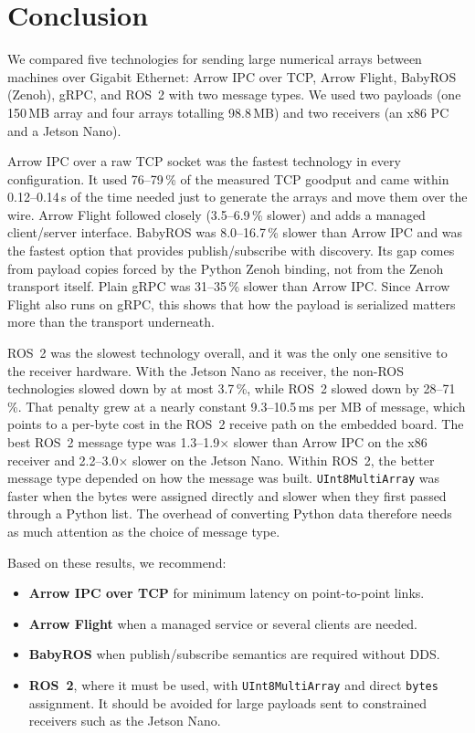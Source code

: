 
\section{Conclusion}
\label{sec:conclusion}

We compared five technologies for sending large numerical arrays between machines
over Gigabit Ethernet: Arrow IPC over TCP, Arrow Flight, BabyROS (Zenoh), gRPC, and
ROS~2 with two message types. We used two payloads (one 150\,MB array and four arrays
totalling 98.8\,MB) and two receivers (an x86 PC and a Jetson Nano).

Arrow IPC over a raw TCP socket was the fastest technology in every configuration.
It used 76--79\,\% of the measured TCP goodput and came within 0.12--0.14\,s of the
time needed just to generate the arrays and move them over the wire. Arrow Flight
followed closely (3.5--6.9\,\% slower) and adds a managed client/server interface.
BabyROS was 8.0--16.7\,\% slower than Arrow IPC and was the fastest option that
provides publish/subscribe with discovery. Its gap comes from payload copies forced by
the Python Zenoh binding, not from the Zenoh transport itself. Plain gRPC was
31--35\,\% slower than Arrow IPC. Since Arrow Flight also runs on gRPC, this shows
that how the payload is serialized matters more than the transport underneath.

ROS~2 was the slowest technology overall, and it was the only one sensitive to the
receiver hardware. With the Jetson Nano as receiver, the non-ROS technologies slowed
down by at most 3.7\,\%, while ROS~2 slowed down by 28--71\,\%. That penalty grew at
a nearly constant 9.3--10.5\,ms per MB of message, which points to a per-byte cost in the
ROS~2 receive path on the embedded board. The best ROS~2 message type was
1.3--1.9$\times$ slower than Arrow IPC on the x86 receiver and 2.2--3.0$\times$ slower
on the Jetson Nano. Within ROS~2, the better message type depended on how the message
was built. \texttt{UInt8MultiArray} was faster when the bytes were assigned directly
and slower when they first passed through a Python list. The overhead of converting
Python data therefore needs as much attention as the choice of message type.

Based on these results, we recommend:
\begin{itemize}
  \item \textbf{Arrow IPC over TCP} for minimum latency on point-to-point links.
  \item \textbf{Arrow Flight} when a managed service or several clients are needed.
  \item \textbf{BabyROS} when publish/subscribe semantics are required without DDS.
  \item \textbf{ROS~2}, where it must be used, with \texttt{UInt8MultiArray} and
  direct \texttt{bytes} assignment. It should be avoided for large payloads sent to
  constrained receivers such as the Jetson Nano.
\end{itemize}


